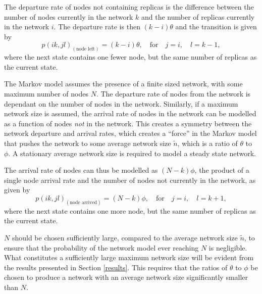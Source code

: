 \documentclass[10pt,a4paper,conference]{IEEEtran}
\begin{document}
The departure rate of nodes not containing replicas is the difference between the number of nodes currently in the network $k$ and the number of replicas currently in the network $i$. The departure rate is then $(k - i)\theta$ and the transition is given by
%
\begin{equation} \label{eq_node_left}
    p(i k,j l)_{(\textrm{node left})} = (k - i)\theta,\quad\textrm{for}\quad j = i,\quad l = k - 1,
\end{equation}
%
where the next state contains one fewer node, but the same number of replicas as the current state.

The Markov model assumes the presence of a finite sized network, with some maximum number of nodes $N$. The departure rate of nodes from the network is dependant on the number of nodes in the network. Similarly, if a maximum network size is assumed, the arrival rate of nodes in the network can be modelled as a function of nodes \emph{not} in the network. This creates a symmetry between the network departure and arrival rates, which creates a ``force'' in the Markov model that pushes the network to some average network size $\tilde{n}$, which is a ratio of $\theta$ to $\phi$. A stationary average network size is required to model a steady state network.

The arrival rate of nodes can thus be modelled as $(N - k)\phi$, the product of a single node arrival rate and the number of nodes not currently in the network, as given by
%
\begin{equation} \label{eq_node_arrived}
    p(i k,j l)_{(\textrm{node arrived})} = (N - k)\phi,\quad\textrm{for}\quad j = i,\quad l = k + 1,
\end{equation}
%
where the next state contains one more node, but the same number of replicas as the current state.


$N$ should be chosen sufficiently large, compared to the average network size $\tilde{n}$, to ensure that the probability of the network model ever reaching $N$ is negligible. What constitutes a sufficiently large maximum network size will be evident from the results presented in Section \ref{results}. This requires that the ratios of $\theta$ to $\phi$ be chosen to produce a network with an average network size significantly smaller than $N$.
\end{document}
